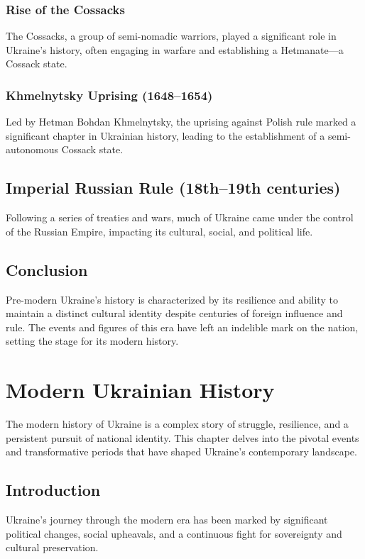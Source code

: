 \documentclass[a4paper,12pt]{book}
\begin{document}
\subsection{Rise of the Cossacks}
The Cossacks, a group of semi-nomadic warriors, played a significant role in Ukraine’s history, often engaging in warfare and establishing a Hetmanate—a Cossack state.

\subsection{Khmelnytsky Uprising (1648–1654)}
Led by Hetman Bohdan Khmelnytsky, the uprising against Polish rule marked a significant chapter in Ukrainian history, leading to the establishment of a semi-autonomous Cossack state.

\section{Imperial Russian Rule (18th–19th centuries)}
\label{sec:imperial-russian-rule}
Following a series of treaties and wars, much of Ukraine came under the control of the Russian Empire, impacting its cultural, social, and political life.

\section{Conclusion}
\label{sec:conclusion-pre-modern-ukraine}
Pre-modern Ukraine’s history is characterized by its resilience and ability to maintain a distinct cultural identity despite centuries of foreign influence and rule. The events and figures of this era have left an indelible mark on the nation, setting the stage for its modern history.

\chapter{Modern Ukrainian History}
\label{ch:modern-ukrainian-history}

The modern history of Ukraine is a complex story of struggle, resilience, and a persistent pursuit of national identity. This chapter delves into the pivotal events and transformative periods that have shaped Ukraine's contemporary landscape.

\section{Introduction}
\label{sec:introduction-modern-ukraine}
Ukraine's journey through the modern era has been marked by significant political changes, social upheavals, and a continuous fight for sovereignty and cultural preservation.
\end{document}
